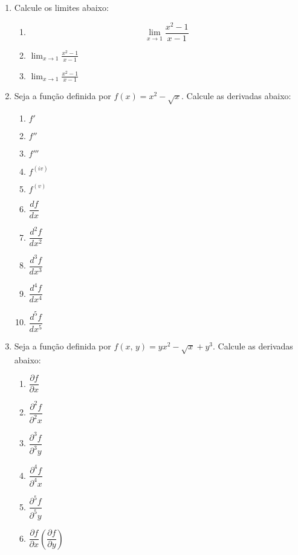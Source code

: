 \documentclass[a4paper, 12pt]{article}
\newcommand{\limite}{\displaystyle\lim} %
\begin{document}
\begin{enumerate}
    \item Calcule os limites abaixo:
    
    \begin{enumerate}
        \item $$\lim_{x \to 1} \dfrac{x^2 - 1}{x - 1}$$ %
        
        \item $\displaystyle\lim_{x \to 1} \frac{x^2 - 1}{x - 1}$ %
        
        \item $\limite_{x \to 1} \frac{x^2 - 1}{x - 1}$%
        
    \end{enumerate}
    
    \item Seja a função definida por $f(x) = x^2 - \sqrt{x}$. Calcule as derivadas abaixo: 
    
    \begin{enumerate}
        \item $f'$ %
        \item $f''$
        \item $f'''$
        \item $f^{(iv)}$
        \item $f^{(v)}$
        \item $\dfrac{df}{dx}$ %
        \item $\dfrac{d^2f}{dx^2}$
        \item $\dfrac{d^3f}{dx^3}$
        \item $\dfrac{d^4f}{dx^4}$
        \item $\dfrac{d^5f}{dx^5}$
    \end{enumerate}
    
    \item Seja a função definida por $f(x, \, y) = yx^2 - \sqrt{x} + y^3$. Calcule as derivadas abaixo:
    
    \begin{enumerate}
        \item $\dfrac{\partial f}{\partial x}$ %
        \item $\dfrac{\partial ^2f}{\partial ^2x}$ 
        \item $\dfrac{\partial ^3f}{\partial ^3y}$ 
        \item $\dfrac{\partial ^4f}{\partial ^4x}$ 
        \item $\dfrac{\partial ^5f}{\partial ^5y}$
        \item $\dfrac{\partial f}{\partial x}\left(\dfrac{\partial f}{\partial y}\right)$
    \end{enumerate}
    

\end{enumerate}
\end{document}
